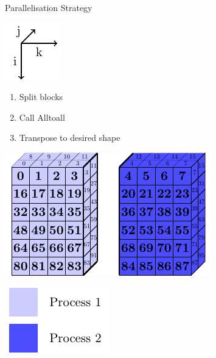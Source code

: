 \documentclass{beamer}
\begin{document}
\begin{frame}{Parallelisation Strategy}
 \begin{minipage}{.3\textwidth}
 \includegraphics[width=.4\textwidth]{SplitConcat3D/Axes}
 \vspace{4em}
 
  \begin{enumerate}
   \item Split blocks 
   \item Call Alltoall
   \item Transpose to desired shape
  \end{enumerate}
  
  \vspace{4em}
 \end{minipage}
 \begin{minipage}{.65\textwidth}
  \includegraphics[width=\textwidth]{SplitConcat3D/RecvLayout_2}
  
  \vspace{1em}
  
  \hfill\includegraphics[width=.3\textwidth]{SplitConcat3D/Legend}
 \end{minipage}
\end{frame}
\end{document}
